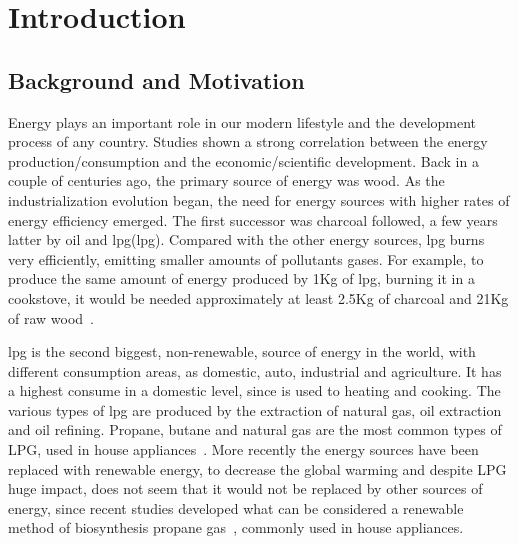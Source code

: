 \cleardoublepage
{}
\chapter{Introduction}
\section{Background and Motivation} %

Energy plays an important role in our modern lifestyle and the development process of any country. Studies shown a strong correlation between the energy production/consumption and the economic/scientific development. Back in a couple of centuries ago, the primary source of energy was wood. As the industrialization evolution began, the need for energy sources with higher rates of energy efficiency emerged\cite{demirbasGlobalEnergySources2004}. The first successor was charcoal followed, a few years latter by oil and \acrshort{lpg}(\acrlong{lpg}). Compared with the other energy sources, \acrshort{lpg} burns very efficiently, emitting smaller amounts of pollutants gases. For example, to produce the same amount of energy produced by 1Kg of \acrshort{lpg}, burning it in a cookstove, it would be needed approximately at least 2.5Kg of charcoal and 21Kg of raw wood~\cite{File201403Multiple}. 

\acrshort{lpg} is the second biggest, non-renewable, source of energy in the world, with different consumption areas, as domestic, auto, industrial and agriculture. It has a highest consume in a domestic level, since is used to heating and cooking. The various types of \acrshort{lpg} are produced
by the extraction of natural gas, oil extraction and  oil refining. Propane, butane and natural gas are the most common types of LPG, used in house appliances~\cite{LiquefiedPetroleumGas}. More recently the energy sources have been replaced with renewable energy, to decrease the global warming and despite LPG huge impact, does not seem that it would not be replaced by other sources of energy, since recent studies developed what can be considered a renewable method of biosynthesis propane gas~\cite{kallioEngineeredPathwayBiosynthesis2014b}, commonly used in house appliances.   


